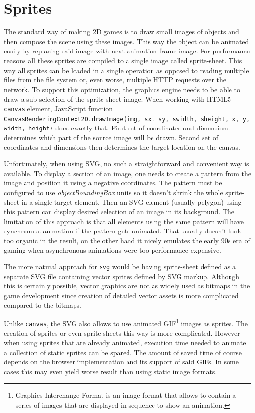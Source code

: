 \documentclass[11pt,oneside, final]{fithesis2}
\begin{document}
\section{Sprites}
The standard way of making 2D games is to draw small images of objects and then compose the scene using these images. This way the object can be animated easily by replacing said image with next animation frame image. For performance reasons all these sprites are compiled to a single image called sprite-sheet. This way all sprites can be loaded in a single operation as opposed to reading multiple files from the file system or, even worse, multiple HTTP requests over the network.\cite{pagella} To support this optimization, the graphics engine needs to be able to draw a sub-selection of the sprite-sheet image. When working with HTML5 \texttt{canvas} element, JavaScript function \texttt{CanvasRenderingContext2D.drawImage(img, sx, sy, swidth, sheight, x, y, width, height)} does exactly that\cite{canvasdrawimage}. First set of coordinates and dimensions determines which part of the source image will be drawn. Second set of coordinates and dimensions then determines the target location on the canvas.

Unfortunately, when using SVG, no such a straightforward and convenient way is available. To display a section of an image, one needs to create a pattern from the image and position it using a negative coordinates. The pattern must be configured to use \emph{objectBoundingBox} units so it doesn't shrink the whole sprite-sheet in a single target element. Then an SVG element (usually polygon) using this pattern can display desired selection of an image in its background. The limitation of this approach is that all elements using the same pattern will have synchronous animation if the pattern gets animated. That usually doesn't look too organic in the result, on the other hand it nicely emulates the early 90s era of gaming when asynchronous animations were too performance expensive.

The more natural approach for \texttt{svg} would be having sprite-sheet defined as a separate SVG file containing vector sprites defined by SVG markup. Although this is certainly possible, vector graphics are not as widely used as bitmaps in the game development since creation of detailed vector assets is more complicated compared to the bitmaps.

Unlike \texttt{canvas}, the SVG also allows to use animated GIF\footnote{Graphics Interchange Format is an image format that allows to contain a series of images that are displayed in sequence to show an animation\cite{gifstandard}.} images as sprites. The creation of sprites or even sprite-sheets this way is more complicated. However when using sprites that are already animated, execution time needed to animate a collection of static sprites can be spared. The amount of saved time of course depends on the browser implementation and its support of said GIFs. In some cases this may even yield worse result than using static image formats.
\end{document}
